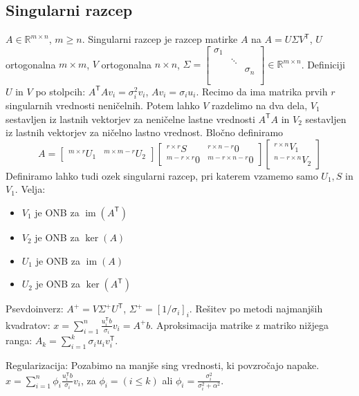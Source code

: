 \documentclass[a4paper,10pt]{article}
\theoremstyle{definition}
\def\R{\mathbb{R}}
\newcommand{\T}{\mathsf{T}\!}
\DeclareMathOperator{\im}{im}
\begin{document}
\subsection*{Singularni razcep}
$A \in \R^{m\times n}$, $m \geq n$. Singularni razcep je razcep matirke $A$ na
$A = U \Sigma V^\T$, $U$ ortogonalna $m\times m$, $V$ ortogonalna $n\times n$,
$\Sigma =
\begin{bmatrix}
  \sigma_1 && \\
  & \ddots & \\
  && \sigma_n \\
  && \\
\end{bmatrix} \in \R^{m\times n}$. Definiciji $U$ in $V$ po stolpcih: $A^\T A v_i = \sigma_i^2 v_i$, $Av_i =
\sigma_iu_i$.
Recimo da ima matrika prvih $r$ singularnih vrednosti neničelnih. Potem lahko
$V$ razdelimo na dva dela, $V_1$ sestavljen iz lastnih vektorjev za neničelne
lastne vrednosti $A^\T A$ in $V_2$ sestavljen iz lastnih vektorjev za ničelno
lastno vrednost. Bločno definiramo
\[ A =
  \begin{bmatrix}
    ^{m\times r} U_1 & ^{m\times m-r}U_2
  \end{bmatrix}
  \begin{bmatrix}
    ^{r\times r} S & ^{r \times n-r}0 \\
    ^{m-r \times r}0 & ^{m-r\times n-r} 0
  \end{bmatrix}
  \begin{bmatrix}
    ^{r \times n} V_1 \\ ^{n-r \times n}V_2
  \end{bmatrix}
\]
Definiramo lahko tudi ozek singularni razcep, pri katerem vzamemo samo $U_1, S$
in $V_1$. Velja: \vspace{-2ex}
\begin{itemize}
  \item $V_1$ je ONB za $\im(A^\T)$
  \item $V_2$ je ONB za $\ker(A)$
  \item $U_1$ je ONB za $\im(A)$
  \item $U_2$ je ONB za $\ker(A^\T)$
\end{itemize}
Psevdoinverz: $A^+ = V\Sigma^+ U^\T$, $\Sigma^+ = [1/\sigma_i]_i$.
Rešitev po metodi najmanjših kvadratov: $x = \sum_{i=1}^n\frac{u_i^\T
b}{\sigma_i}v_i = A^+b$.
Aproksimacija matrike z matriko nižjega ranga:
$A_k = \sum_{i=1}^k \sigma_i u_i v_i^\T$.

Regularizacija: Pozabimo na manjše sing vrednosti, ki povzročajo napake.
$x = \sum_{i=1}^n \phi_i \frac{u_i^\T b}{\sigma_i}v_i$, za
$\phi_i = (i \leq k)$ ali $\phi_i = \frac{\sigma_i^2}{\sigma_i^2 +
\alpha^2}$.
\end{document}
